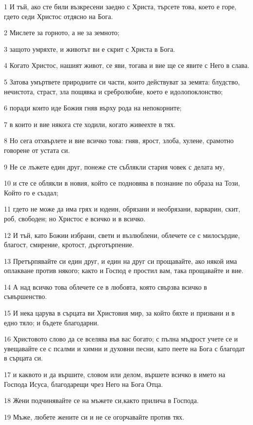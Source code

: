 \par 1 И тъй, ако сте били възкресени заедно с Христа, търсете това, което е горе, гдето седи Христос отдясно на Бога.
\par 2 Мислете за горното, а не за земното;
\par 3 защото умряхте, и животът ви е скрит с Христа в Бога.
\par 4 Когато Христос, нашият живот, се яви, тогава и вие ще се явите с Него в слава.
\par 5 Затова умъртвете природните си части, които действуват за земята: блудство, нечистота, страст, зла пощявка и сребролюбие, което е идолопоклонство;
\par 6 поради които иде Божия гняв върху рода на непокорните;
\par 7 в които и вие някога сте ходили, когато живеехте в тях.
\par 8 Но сега отхвърлете и вие всичко това: гняв, ярост, злоба, хулене, срамотно говорене от устата си.
\par 9 Не се лъжете един друг, понеже сте съблякли стария човек с делата му,
\par 10 и сте се облякли в новия, който се подновява в познание по образа на Този, Който го е създал;
\par 11 гдето не може да има грях и юдеин, обрязани и необрязани, варварин, скит, роб, свободен; но Христос е всичко и в всичко.
\par 12 И тъй, като Божии избрани, свети и възлюблени, облечете се с милосърдие, благост, смирение, кротост, дърготърпение.
\par 13 Претърпявайте си един друг, и един на друг си прощавайте, ако някой има оплакване против някого; както и Господ е простил вам, така прощавайте и вие.
\par 14 А над всичко това облечете се в любовта, която свързва всичко в съвършенство.
\par 15 И нека царува в сърцата ви Христовия мир, за който бяхте и призвани и в едно тяло; и бъдете благодарни.
\par 16 Христовото слово да се вселява във вас богато; с пълна мъдрост учете се и увещавайте се с псалми и химни и духовни песни, като пеете на Бога с благодат в сърцата си.
\par 17 и каквото и да вършите, словом или делом, вършете всичко в името на Господа Исуса, благодарещи чрез Него на Бога Отца.
\par 18 Жени подчинявайте се на мъжете си,както прилича в Господа.
\par 19 Мъже, любете жените си и не се огорчавайте против тях.
